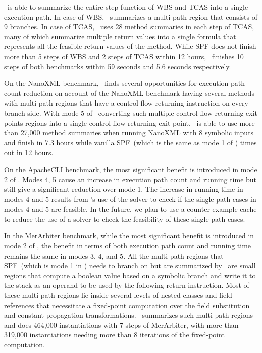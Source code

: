 \tool\ is able to summarize the entire step function of WBS and TCAS into a single execution path.
%
In case of WBS, \tool\ summarizes a multi-path region that consists of 9 branches.
%
In case of TCAS, \tool\ uses 28 method summaries in each step of TCAS, many of which summarize multiple return values
into a single formula that represents all the feasible return values of the method.
%
While SPF does not finish more than 5 steps of WBS and 2 steps of TCAS within 12 hours, \tool\ finishes 10 steps of both
benchmarks within 59 seconds and 5.6 seconds respectively.

On the NanoXML benchmark, \tool\ finds several opportunities for execution path count reduction on account of the
NanoXML benchmark having several methods with multi-path regions that have a control-flow returning instruction on every
branch side.
%
With mode 5 of \tool\ converting such multiple control-flow returning exit points regions into a single control-flow
returning exit point, \tool\ is able to use more than 27,000 method summaries when running NanoXML with 8 symbolic
inputs and finish in 7.3 hours while vanilla SPF~(which is the same as mode 1 of \tool)
times out in 12 hours.

On the ApacheCLI benchmark, the most significant benefit is introduced in mode 2 of \tool.
%
Modes 4, 5 cause an increase in execution path count and running time but still give a significant reduction over
mode 1.
%
The increase in running time in modes 4 and 5 results from \tool\rq s use of the solver to check if the single-path cases
in modes 4 and 5 are feasible.
%
In the future, we plan to use a counter-example cache to reduce the use of a solver to check the feasibility of these
single-path cases.

In the MerArbiter benchmark, while the most significant benefit is introduced in mode 2 of \tool, the benefit in terms of
both execution path count and running time remains the same in modes 3, 4, and 5.
%
All the multi-path regions that SPF~(which is mode 1 in \tool) needs to branch on but are summarized by \tool\ are small
regions that compute a boolean value based on a symbolic branch and write it to the stack as an operand to be used
by the following return instruction.
%
Most of these multi-path regions lie inside several levels of nested classes and field references that necessitate
a fixed-point computation over the field substitution and constant propagation transformations.
%
\tool\ summarizes such multi-path regions and does 464,000 instantiations with 7 steps of MerArbiter, with more than
319,000 instantiations needing more than 8 iterations of the fixed-point computation.